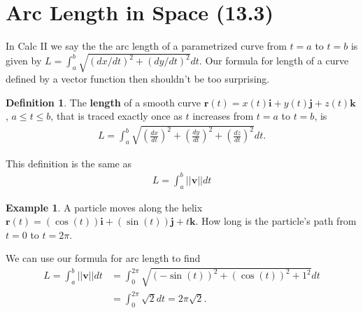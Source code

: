 \documentclass[12pt, letter]{article}
\theoremstyle{plain}
\numberwithin{theorem}{section}
\theoremstyle{definition}
\newtheorem{definition}[theorem]{Definition}
\newtheorem{example}[theorem]{Example}
\begin{document}
\newpage


\section{Arc Length in Space (13.3)}

In Calc II we say the the arc length of a parametrized curve from $t=a$ to $t=b$ is given by $L =  \int_a^b \sqrt{(dx/dt)^2+(dy/dt)^2}dt$. Our formula for length of a curve defined by a vector function then shouldn't be too surprising.

\bigskip

\begin{definition}
The \textbf{length} of a smooth curve $\bm{r}(t) = x(t)\bm{i}+y(t)\bm{j}+z(t)\bm{k}$, $a\leq t\leq b$, that is traced exactly once as $t$ increases from $t=a$ to $t=b$, is
\begin{align*}
L = \int_a^b \sqrt{\left(\frac{dx}{dt}\right)^2+\left(\frac{dy}{dt}\right)^2+\left(\frac{dz}{dt}\right)^2} dt.
\end{align*}
\end{definition}

\bigskip

This definition is the same as
\begin{align*}
L = \int_a^b ||\bm{v}||dt
\end{align*}

\bigskip

\hrulefill

\bigskip

\begin{example}
A particle moves along the helix $\bm{r}(t) = (\cos(t))\bm{i} + (\sin(t))\bm{j} + t\bm{k}$. How long is the particle's path from $t=0$ to $t=2\pi$.\\

\smallskip

We can use our formula for arc length to find
\begin{align*}
L = \int_a^b ||\bm{v}||dt &= \int_0^{2\pi} \sqrt{(-\sin(t))^2+(\cos(t))^2+1^2}dt\\
&=\int_0^{2\pi} \sqrt{2}dt = 2\pi\sqrt{2}.
\end{align*}
\end{example}

\bigskip

\hrulefill
\end{document}
